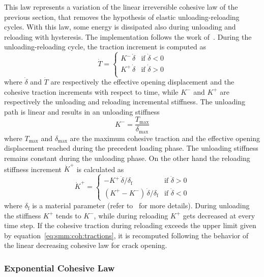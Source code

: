 This law represents a variation of the linear irreversible cohesive
law of the previous section, that removes the hypothesis of elastic
unloading-reloading cycles. With this law, some energy is dissipated
also during unloading and reloading with hysteresis. The
implementation follows the work of~\cite{nguyen2001}. During the
unloading-reloading cycle, the traction increment is computed as
\begin{equation}
  \dot{T} =
  \begin{cases}
    K^- \, \dot{\delta} & \text{if $\dot{\delta} < 0$} \\
    K^+ \, \dot{\delta} & \text{if $\dot{\delta} > 0$} \\
  \end{cases}
\end{equation}
where $\dot{\delta}$ and $\dot{T}$ are respectively the effective
opening displacement and the cohesive traction increments with respect
to time, while $K^-$ and $K^+$ are respectively the unloading and
reloading incremental stiffness. The unloading path is linear and
results in an unloading stiffness
\begin{equation}
  K^- = \frac{T_\mathrm{max}}{\delta_\mathrm{max}}
\end{equation}
where $T_\mathrm{max}$ and $\delta_\mathrm{max}$ are the maximum
cohesive traction and the effective opening displacement reached
during the precedent loading phase. The unloading stiffness remains
constant during the unloading phase. On the other hand the reloading
stiffness increment $\dot{K}^+$ is calculated as
\begin{equation}
  \dot{K}^+ =
  \begin{cases}
    - K^+ \, \dot{\delta} / \delta_\mathrm{f} & \text{if $\dot{\delta}
      > 0$} \\
    \left( K^+ - K^- \right) \, \dot{\delta} / \delta_\mathrm{f} &
    \text{if $\dot{\delta} < 0$}
  \end{cases}
\end{equation}
where $\delta_\mathrm{f}$ is a material parameter (refer
to~\cite{vocialta15} for more details). During unloading the stiffness
$K^+$ tends to $K^-$, while during reloading $K^+$ gets decreased at
every time step. If the cohesive traction during reloading exceeds the
upper limit given by equation~\eqref{eq:smm:coh:tractions}, it is
recomputed following the behavior of the linear decreasing cohesive
law for crack opening.

\subsubsection{Exponential Cohesive Law}

